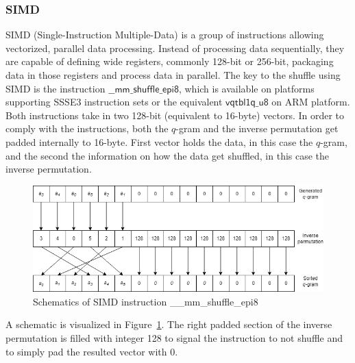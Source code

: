 \documentclass[twoside,a4paper,bsc]{master}
\newcommand{\Qgram}[1]{\(#1\)-gram}
\begin{document}
\subsubsection{SIMD}
SIMD (Single-Instruction Multiple-Data) is a group of instructions allowing
vectorized, parallel data processing. Instead of processing data
sequentially, they are capable of defining wide registers, commonly 128-bit
or 256-bit, packaging data in those registers and process data in parallel.
The key to the shuffle using SIMD is the instruction
\(\mathsf{\_\_mm\_shuffle\_epi8}\), which is available on platforms
supporting
SSSE3 instruction sets or the equivalent \(\mathsf{vqtbl1q\_u8}\) on ARM
platform. Both instructions take in two 128-bit (equivalent to 16-byte)
vectors.
In order to comply with the instructions, both the \Qgram{q} and the
inverse
permutation get padded internally to 16-byte. First vector holds the data,
in
this case the \Qgram{q}, and the second the information on how the data get
shuffled, in this case the inverse permutation.
\begin{figure}[t]
\begin{center}
\includegraphics[scale=0.6]{graphics/SIMD.png}
\end{center}
\caption{Schematics of SIMD instruction \_\_mm\_shuffle\_epi8}
\label{fig:simd}
\end{figure}
A schematic is visualized in Figure~\ref{fig:simd}. The right padded
section of the inverse permutation is filled with integer 128 to signal the
instruction to not shuffle and to simply pad the resulted vector with 0.
\end{document}

